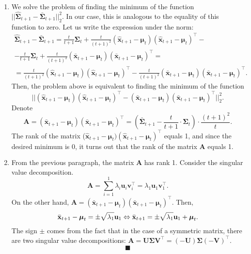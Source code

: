 \documentclass[12pt]{article}
\begin{document}
{\begin{enumerate}
	\item We solve the problem of finding the minimum of the function $||\hat{\mathbf{\Sigma}}_{t+1} - \bar{\mathbf{\Sigma}}_{t+1}||_2^2$. In our case, this is analogous to the equality of this function to zero. Let us write the expression under the norm:
	\begin{gather*}
		\hat{\mathbf{\Sigma}}_{t+1} - \bar{\mathbf{\Sigma}}_{t+1} = \frac{t}{t+1}\mathbf{\Sigma}_t + \frac{t}{(t+1)^2}(\hat{\mathbf{x}}_{t+1}-\boldsymbol{\mu}_t)(\hat{\mathbf{x}}_{t+1}-\boldsymbol{\mu}_t)^\intercal -\\- \frac{t}{t+1}\mathbf{\Sigma}_t + \frac{t}{(t+1)^2}(\bar{\mathbf{x}}_{t+1}-\boldsymbol{\mu}_t)(\bar{\mathbf{x}}_{t+1}-\boldsymbol{\mu}_t)^\intercal =\\
		=\frac{t}{(t+1)^2}(\hat{\mathbf{x}}_{t+1}-\boldsymbol{\mu}_t)(\hat{\mathbf{x}}_{t+1}-\boldsymbol{\mu}_t)^\intercal -\frac{t}{(t+1)^2}(\bar{\mathbf{x}}_{t+1}-\boldsymbol{\mu}_t)(\bar{\mathbf{x}}_{t+1}-\boldsymbol{\mu}_t)^\intercal.
 	\end{gather*}
 	Then, the problem above is equivalent to finding the minimum of the function \[||(\hat{\mathbf{x}}_{t+1}-\boldsymbol{\mu}_t)(\hat{\mathbf{x}}_{t+1}-\boldsymbol{\mu}_t)^\intercal-(\bar{\mathbf{x}}_{t+1}-\boldsymbol{\mu}_t)(\bar{\mathbf{x}}_{t+1}-\boldsymbol{\mu}_t)^\intercal||_2^2.\]
 	Denote \[\mathbf{A} = (\bar{\mathbf{x}}_{t+1}-\boldsymbol{\mu}_t)(\bar{\mathbf{x}}_{t+1}-\boldsymbol{\mu}_t)^\intercal = \left(\bar{\mathbf{\Sigma}}_{t+1} - \frac{t}{t+1} \cdot \mathbf{\Sigma}_t \right) \cdot \frac{(t+1)^2}{t}.\]
 	The rank of the matrix ($\hat{\mathbf{x}}_{t+1}-\boldsymbol{\mu}_t)(\hat{\mathbf{x}}_{t+1}-\boldsymbol{\mu}_t)^\intercal$ equals 1, and since the desired minimum is 0, it turns out that the rank of the matrix $\mathbf{A}$ equals 1.
 	
 	\item From the previous paragraph, the matrix $\mathbf{A}$ has rank 1. Consider the singular value decomposition. \[
 		\mathbf{A} = \sum_{i=1}^{1} \lambda_i \mathbf{u}_i \mathbf{v}_i^\intercal = \lambda_1 \mathbf{u}_1 \mathbf{v}_1^\intercal.
 	\]
 	On the other hand, $\mathbf{A} = (\bar{\mathbf{x}}_{t+1}-\boldsymbol{\mu}_t)(\bar{\mathbf{x}}_{t+1}-\boldsymbol{\mu}_t)^\intercal$. Then, \[
 	\bar{\mathbf{x}}_{t+1}-\boldsymbol{\mu}_t = \pm\sqrt{\lambda_1} \mathbf{u}_1 \Leftrightarrow\\
 	\bar{\mathbf{x}}_{t+1} = \pm\sqrt{\lambda_1} \mathbf{u}_1 + \boldsymbol{\mu}_t.
 	\]
 	The sign $\pm$ comes from the fact that in the case of a symmetric matrix, there are two singular value decompositions: $\mathbf{A}=\mathbf{U}\mathbf{\Sigma} \mathbf{V}^\intercal=(-\mathbf{U})\mathbf{\Sigma} (-\mathbf{V})^\intercal$.
 	$$ \blacksquare $$
\end{enumerate}

}
\end{document}
